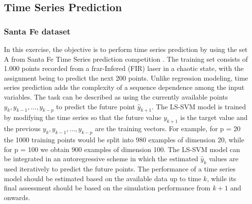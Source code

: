 \documentclass[conference,compsoc]{IEEEtran}
\begin{document}
\subsection{Time Series Prediction}

\subsubsection{Santa Fe dataset}
In this exercise, the objective is to perform time series prediction by using the set A from Santa Fe Time Series prediction competition \cite{santafe}.  The training set consists of 1.000 points recorded from a frar-Infered (FIR) laser in a chaotic state, with the assignment being to predict the next 200 points. Unlike regression modeling, time series prediction adds the complexity of a sequence dependence among the input variables. The task can be described as using the currently available points $y_k,y_{k−1},...,y_{k−p}$ to predict the future point $\hat{y}_{k+1}$. The LS-SVM model is trained by modifying the time series so that the future value $y_{k+1}$ is the target value and the previous $y_k,y_{k−1},...,y_{k−p}$ are the training vectors. For example, for p = 20 the 1000 training points would be split into 980 examples of dimension 20, while for p = 100 we obtain 900 examples of dimension 100. The  LS-SVM model can be integrated in an autoregressive scheme in which the estimated $\hat{y}_k$ values are used iteratively to predict the future points. The performance of a time series model should be estimated based on the available data up to time $k$, while its final assessment should be based on the simulation performance from ${k+1}$ and onwards.
\end{document}
